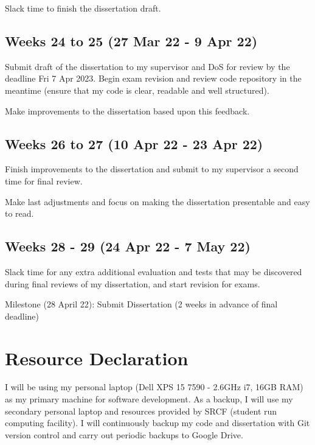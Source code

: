 \begin{refsection}
  Slack time to finish the dissertation draft.

  \subsection*{Weeks 24 to 25 (27 Mar 22 - 9 Apr 22)}

  Submit draft of the dissertation to my supervisor and DoS for review by the deadline Fri 7 Apr 2023. Begin exam revision and review code repository in the meantime (ensure that my code is clear, readable and well structured).

  Make improvements to the dissertation based upon this feedback.

  \subsection*{Weeks 26 to 27 (10 Apr 22 - 23 Apr 22)}

  Finish improvements to the dissertation and submit to my supervisor a second time for final review. 

  Make last adjustments and focus on making the dissertation presentable and easy to read. 

  \subsection*{Weeks 28 - 29 (24 Apr 22 - 7 May 22)}

  Slack time for any extra additional evaluation and tests that may be discovered during final reviews of my dissertation, and start revision for exams.

  Milestone (28 April 22): Submit Dissertation (2 weeks in advance of final deadline)

  \section{Resource Declaration}

  I will be using my personal laptop (Dell XPS 15 7590 - 2.6GHz i7, 16GB RAM) as my primary machine for software development. As a backup, I will use my secondary personal laptop and resources provided by SRCF (student run computing facility). I will continuously backup my code and dissertation with Git version control and carry out periodic backups to Google Drive.

  
  \newpage

  \printbibliography[heading=subbibliography]
\end{refsection}